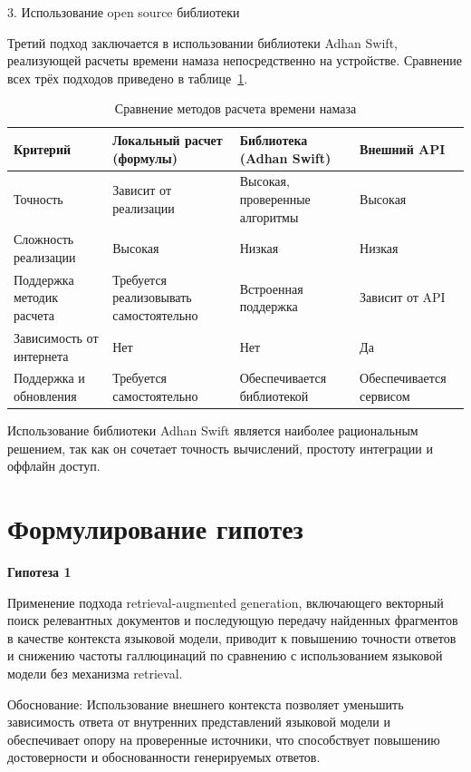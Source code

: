 3. Использование open source библиотеки


Третий подход заключается в использовании библиотеки Adhan Swift, реализующей расчеты времени намаза непосредственно на устройстве. Сравнение всех трёх подходов приведено в таблице~\ref{tab:prayer}.


\begin{table}[htbp]
	\centering
	\caption{Сравнение методов расчета времени намаза}
	\label{tab:prayer}
	\small
	\begin{tabular}{|p{2.8cm}|p{2.8cm}|p{2.8cm}|p{2.8cm}|}
	\hline
		Критерий & Локальный расчет (формулы) & Библиотека (Adhan Swift) & Внешний API \\
	\hline
		Точность & Зависит от реализации & Высокая, проверенные алгоритмы & Высокая \\
	\hline
		Сложность реализации & Высокая & Низкая & Низкая \\
	\hline
		Поддержка методик расчета & Требуется реализовывать самостоятельно & Встроенная поддержка & Зависит от API \\
	\hline
		Зависимость от интернета & Нет & Нет & Да \\
	\hline
		Поддержка и обновления & Требуется самостоятельно & Обеспечивается библиотекой & Обеспечивается сервисом \\
	\hline
	\end{tabular}
\end{table}


Использование библиотеки Adhan Swift является наиболее рациональным решением, так как он сочетает точность вычислений, простоту интеграции и оффлайн доступ.


\section{Формулирование гипотез}


\textbf{Гипотеза 1}


Применение подхода retrieval-augmented generation, включающего векторный поиск релевантных документов и последующую передачу найденных фрагментов в качестве контекста языковой модели, приводит к повышению точности ответов и снижению частоты галлюцинаций по сравнению с использованием языковой модели без механизма retrieval.


Обоснование:\textbf{ }Использование внешнего контекста позволяет уменьшить зависимость ответа от внутренних представлений языковой модели и обеспечивает опору на проверенные источники, что способствует повышению достоверности и обоснованности генерируемых ответов.


